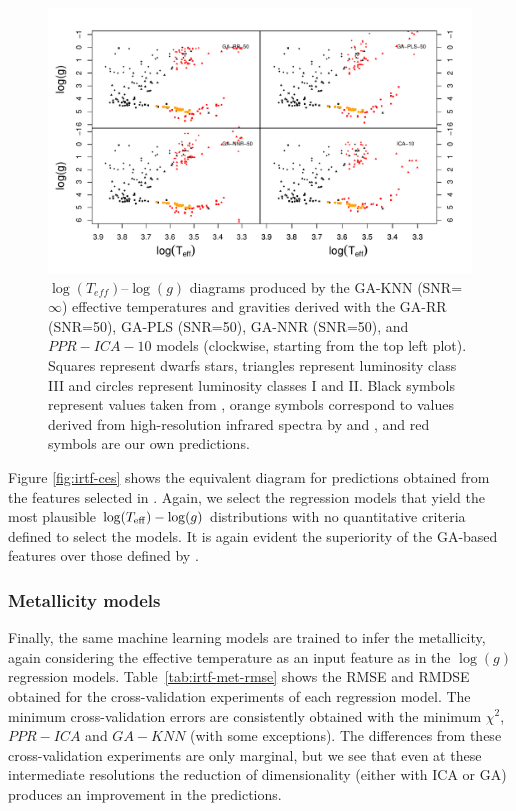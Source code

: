 \begin{figure}
 \begin{center}
   \includegraphics[width=\textwidth]{figs/ordieres-fig4}
\caption{$\log(T_{eff})$--$\log(g)$ diagrams produced by the GA-KNN
   (SNR=$\infty$) effective temperatures and gravities derived with
   the GA-RR (SNR=50), GA-PLS (SNR=50), GA-NNR (SNR=50), and
   $PPR-ICA-10$ models (clockwise, starting from the top left
   plot). Squares represent dwarfs stars, triangles represent
   luminosity class {\sc III} and circles represent luminosity classes
   {\sc I} and {\sc II}. Black symbols represent values taken
   from \protect\cite{cesetti}, orange symbols correspond to values
   derived from high-resolution infrared spectra by \protect\cite{esm1}
   and \protect\cite{esm2}, and red symbols are our own predictions.}

\label{fig:lt_lg_ga}
 \end{center}
\end{figure}

Figure \ref{fig:irtf-ces} shows the equivalent diagram for predictions
obtained from the features selected in \cite{cesetti}. Again, we
select the regression models that yield the most plausible
$\log(T_{\rm eff})-\log(g)$ distributions with no quantitative
criteria defined to select the models. It is again evident the
superiority of the GA-based features over those defined
by \cite{cesetti}.

\subsubsection{Metallicity models} 
\label{sect:irtf-met}

Finally, the same machine learning models are trained to infer the
metallicity, again considering the effective temperature as an input
feature as in the $\log(g)$ regression
models. Table~\ref{tab:irtf-met-rmse} shows the RMSE and RMDSE
obtained for the cross-validation experiments of each regression
model. The minimum cross-validation errors are consistently obtained
with the minimum $\chi^2$, $PPR-ICA$ and $GA-KNN$ (with some
exceptions). The differences from these cross-validation experiments
are only marginal, but we see that even at these intermediate
resolutions the reduction of dimensionality (either with ICA or GA)
produces an improvement in the predictions. 

